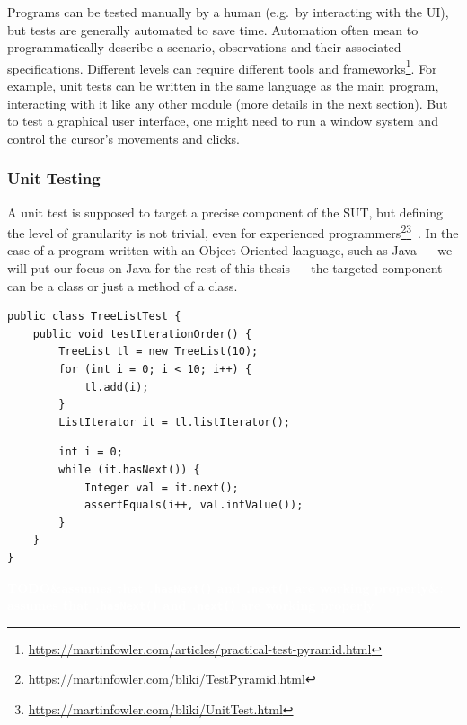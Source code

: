 \documentclass[11pt]{sdm_internship}
\newcommand{\todo}[1]{\colorbox{Red!75}{\textcolor{white}{\textbf{TODO\ifx&#1&\else: #1\fi}}}}
\theoremstyle{definition}
\begin{document}
Programs can be tested manually by a human (e.g.\ by interacting with the UI), but tests are generally automated to save time.
Automation often mean to programmatically describe a scenario, observations and their associated specifications.
Different levels can require different tools and frameworks\footnote{\url{https://martinfowler.com/articles/practical-test-pyramid.html}}.
For example, unit tests can be written in the same language as the main program, interacting with it like any other module (more details in the next section).
But to test a graphical user interface, one might need to run a window system and control the cursor's movements and clicks.

\subsubsection{Unit Testing}%
\label{sssec:unit_testing}

A unit test is supposed to target a precise component of the SUT, but defining the level of granularity is not trivial, even for experienced programmers\footnote{\url{https://martinfowler.com/bliki/TestPyramid.html}}\footnote{\url{https://martinfowler.com/bliki/UnitTest.html}}~\cite{runeson2006survey}.
In the case of a program written with an Object-Oriented language, such as Java --- we will put our focus on Java for the rest of this thesis --- the targeted component can be a class or just a method of a class.

\begin{listing}[H]
  \centering
  \begin{verbatim}
public class TreeListTest {
    public void testIterationOrder() {
        TreeList tl = new TreeList(10);
        for (int i = 0; i < 10; i++) {
            tl.add(i);
        }
        ListIterator it = tl.listIterator();
  \end{verbatim}
  \begin{verbatim}
        int i = 0;
        while (it.hasNext()) {
            Integer val = it.next();
            assertEquals(i++, val.intValue());
        }
    }
}
  \end{verbatim}
  \caption{Example of an object-oriented unit test (taken, and adapted for readability, from the Apache Commons Collections, in the class TreeListTest, line 270\protect\footnotemark): it consists of test inputs (lines 3--7) that manipulate the SUT\@; and assertions (line 11).\todo{what about lines 9 \& 10}}%
\label{lst:test_example}
\end{listing}
\todo{assumes that \texttt{.hasNext()} and \texttt{.next()} are working properly}
\end{document}
